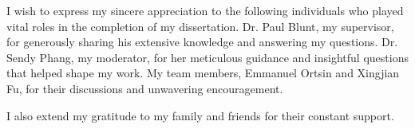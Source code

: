 \cleardoublepage
{}


\begin{acknowledgements}

I wish to express my sincere appreciation to the following individuals who played vital roles in the completion of my dissertation. Dr. Paul Blunt, my supervisor, for generously sharing his extensive knowledge and answering my questions. Dr. Sendy Phang, my moderator, for her meticulous guidance and insightful questions that helped shape my work. My team members, Emmanuel Ortsin and Xingjian Fu, for their discussions and unwavering encouragement.

I also extend my gratitude to my family and friends for their constant support.

\end{acknowledgements}